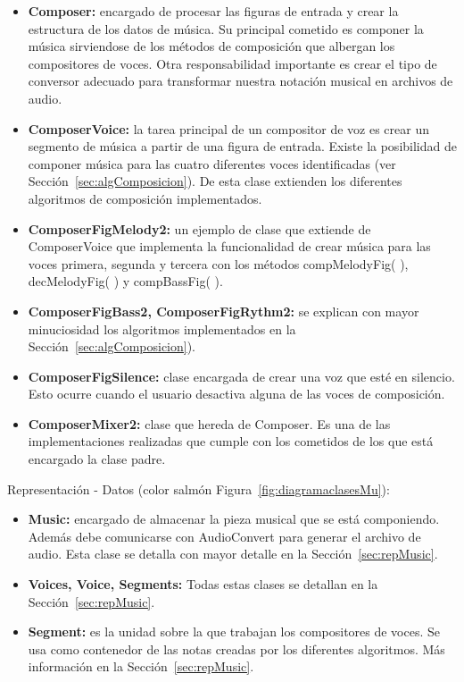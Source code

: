 \begin{itemize}
	
	\item \textbf{Composer:} encargado de procesar las figuras de entrada y crear la estructura de los datos de música. Su principal cometido es componer la música sirviendose de los métodos de composición que albergan los compositores de voces. Otra responsabilidad importante es crear el tipo de conversor adecuado para transformar nuestra notación musical en archivos de audio.

	\item \textbf{ComposerVoice:} la tarea principal de un compositor de voz es crear un segmento de música a partir de una figura de entrada. Existe la posibilidad de componer música para las cuatro diferentes voces identificadas (ver Sección~\ref{sec:algComposicion}). De esta clase extienden los diferentes algoritmos de composición implementados.

	\item \textbf{ComposerFigMelody2:} un ejemplo de clase que extiende de ComposerVoice que implementa la funcionalidad de crear música para las voces primera, segunda y tercera con los métodos compMelodyFig( ), decMelodyFig( ) y compBassFig( ).

	\item \textbf{ComposerFigBass2, ComposerFigRythm2:} se explican con mayor minuciosidad los algoritmos implementados en la Sección~\ref{sec:algComposicion}).

	\item \textbf{ComposerFigSilence:} clase encargada de crear una voz que esté en silencio. Esto ocurre cuando el usuario desactiva alguna de las voces de composición.

	\item \textbf{ComposerMixer2:} clase que hereda de Composer. Es una de las implementaciones realizadas que cumple con los cometidos de los que está encargado la clase padre.

\end{itemize}

Representación - Datos (color salmón Figura~\ref{fig:diagramaclasesMu}):

\begin{itemize}
	
	\item \textbf{Music:} encargado de almacenar la pieza musical que se está componiendo. Además debe comunicarse con AudioConvert para generar el archivo de audio. Esta clase se detalla con mayor detalle en la Sección~\ref{sec:repMusic}.

	\item \textbf{Voices, Voice, Segments:} Todas estas clases se detallan en la Sección~\ref{sec:repMusic}.

	\item \textbf{Segment:} es la unidad sobre la que trabajan los compositores de voces. Se usa como contenedor de las notas creadas por los diferentes algoritmos. Más información en la Sección~\ref{sec:repMusic}.

\end{itemize}

